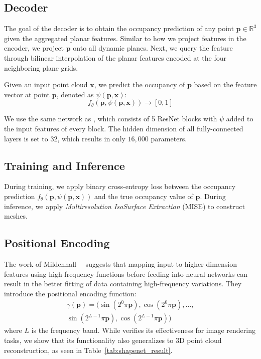 \documentclass[10pt,twocolumn,letterpaper]{article}
\newcommand{\boldparagraph}[1]{\vspace{0.2cm}\noindent{\bf #1:} }
\begin{document}
\subsection{Decoder} \label{sec:decoder}

The goal of the decoder is to obtain the occupancy prediction of any point $\mathbf{p} \in \mathbb{R}^3$ given the aggregated planar features. Similar to how we project features in the encoder, we project $\mathbf{p}$ onto all dynamic planes. Next, we query the feature
through bilinear interpolation of the planar features encoded at the four neighboring plane grids.

\boldparagraph{Occupancy prediction} Given an input point cloud $\mathbf{x}$, we predict the occupancy of $\mathbf{p}$ based on the feature vector at point $\mathbf{p}$, denoted as $\psi(\mathbf{p}, \mathbf{x})$:
\begin{equation}
    f_{\theta}(\mathbf{p}, \psi(\mathbf{p}, \mathbf{x})) \rightarrow [0,1]
    \label{eq:occupancy_prediction}
\end{equation}

We use the same network as \cite{niemeyer2020differentiable}, which consists of 5 ResNet blocks with $\psi$ added to the input features of every block. The hidden dimension of all fully-connected layers is set to 32, which results in only $16,000$ parameters.

\subsection{Training and Inference}\label{sec:training}
During training, we apply binary cross-entropy loss between the occupancy prediction $ f_{\theta}(\mathbf{p}, \psi(\mathbf{p}, \mathbf{x}))$ and the true occupancy value of $\mathbf{p}$. During inference, we apply \emph{Multiresolution IsoSurface Extraction} (MISE) \cite{mescheder2018occupancy} to construct meshes.

\subsection{Positional Encoding}

The work of Mildenhall~\etal~\cite{mildenhall2020nerf} suggests that mapping input to higher dimension features using high-frequency functions before feeding into neural networks can result in the better fitting of data containing high-frequency variations. They introduce the positional encoding function:
\begin{equation}
\begin{split}
    \gamma(\mathbf{p}) = (\sin(2^0\pi \mathbf{p}), \cos(2^0\pi \mathbf{p}),\dots, \\
    \sin(2^{L-1}\pi \mathbf{p}), \cos(2^{L-1}\pi \mathbf{p}))
\end{split}
\label{eq:pos_encoding}
\end{equation}
where $L$ is the frequency band. While \cite{mildenhall2020nerf} verifies its effectiveness for image rendering tasks, we show that its functionality also generalizes to 3D point cloud reconstruction, as seen in Table~\ref{tab:shapenet_result}.
\end{document}
